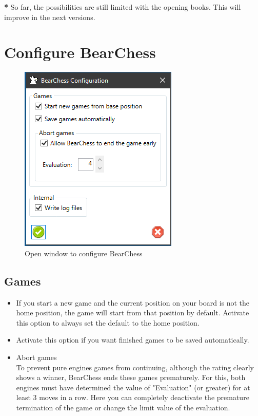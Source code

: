 \documentclass[11pt,a4paper]{article}
\begin{document}
	{\color{red}\textbf{*}} So far, the possibilities are still limited with the opening books. This will improve in the next versions. 
	
	\section{Configure BearChess} \label{ConfigureBearChess}
	
	\begin{figure}[H]
		\centering
		\includegraphics[scale=1.0]{ConfigureBearChess.png}
		\caption{Open window to configure BearChess}
		\label{fig:ConfigureBearChess}
	\end{figure}
	
	\subsection{Games}
	\begin{itemize}
		\item If you start a new game and the current position on your board is not the home position, the game will start from that position by default. Activate this option to always set the default to the home position.
		\item Activate this option if you want finished games to be saved automatically.
		\item Abort games\\To prevent pure engines games from continuing, although the rating clearly shows a winner, BearChess ends these games prematurely. For this, both engines must have determined the value of "Evaluation" (or greater) for at least 3 moves in a row. Here you can completely deactivate the premature termination of the game or change the limit value of the evaluation.
	\end{itemize}
	
\end{document}
